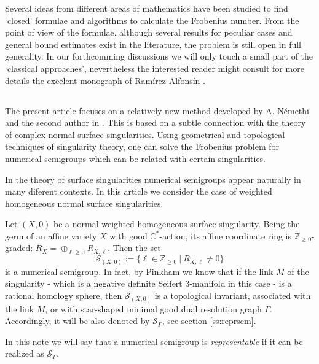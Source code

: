 \documentclass[oneside]{amsart}
\numberwithin{equation}{section}
\numberwithin{equation}{subsection}
\theoremstyle{plain}
\theoremstyle{definition}
\def\Z{\mathbb Z}
\newcommand{\calS}{{\mathcal S}}\newcommand{\cals}{{\bf s}}\newcommand{\calst}{{\bf st}}\newcommand{\cS}{{\mathcal S}}
\renewcommand{\Z}{\mathbb{Z}}
\begin{document}
Several ideas from different areas of mathematics have been studied to find `closed' formulae and algorithms to calculate the Frobenius number. From the point of view of the formulae, although several results for peculiar cases and general bound estimates exist in the literature, the problem is still open in full generality. In our forthcomming discussions we will only touch a small part of the `classical approaches', nevertheless the interested reader might consult for more details the excelent monograph of Ram\'irez Alfons\'in \cite{RamAlf}.

\subsection{} The present article focuses on a relatively new method developed by A. N\'emethi and the second author in \cite{stronglyflat}. This is based on a subtle connection with the theory of complex normal surface singularities. Using geometrical and topological techniques of singularity theory, one can solve the Frobenius problem for numerical semigroups which can be related with certain singularities. 

\vspace{0.2cm}
In the theory of surface singularities numerical semigroups appear naturally in many diferent contexts. In this article we consider the case of weighted homogeneous normal surface singularities. 

Let $(X,0)$ be a normal weighted homogeneous surface singularity. Being the germ of an affine variety $X$ with good $\mathbb{C}^*$-action, its affine coordinate ring is $\Z_{\geq 0}$-graded: $R_X=\oplus_{\ell\geq 0}R_{X,\ell}$. Then the set $$\calS_{(X,0)}:=\{\ell \in \Z_{\geq 0} \ | \ R_{X,\ell}\neq 0\}$$ is a numerical semigroup. In fact, by Pinkham \cite{art_pink} we know that if the link $M$ of the singularity - which is a negative definite Seifert $3$-manifold in this case - is a rational homology sphere, then $\calS_{(X,0)}$ is a topological invariant, associated with the link $M$, or with star-shaped minimal good dual resolution graph $\Gamma$. Accordingly, it will be also denoted by $\calS_{\Gamma}$, see section \ref{ss:reprsem}. 

In this note we will say that a numerical semigroup is {\it representable} if it can be realized as $\calS_{\Gamma}$.  
\end{document}
